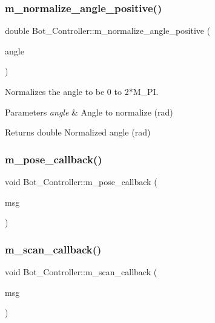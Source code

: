 \subsubsection{\texorpdfstring{m\+\_\+normalize\+\_\+angle\+\_\+positive()}{m\_normalize\_angle\_positive()}}
{\footnotesize\ttfamily double Bot\+\_\+\+Controller\+::m\+\_\+normalize\+\_\+angle\+\_\+positive (\begin{DoxyParamCaption}\item[{double}]{angle }\end{DoxyParamCaption})\hspace{0.3cm}{\ttfamily [protected]}}



Normalizes the angle to be 0 to 2$\ast$\+M\+\_\+\+PI. 


\begin{DoxyParams}{Parameters}
{\em angle} & Angle to normalize (rad) \\
\hline
\end{DoxyParams}
\begin{DoxyReturn}{Returns}
double Normalized angle (rad) 
\end{DoxyReturn}
\mbox{\label{class_bot___controller_acc77fd887b8ddc97431a33f3cf72e82c}} 
\subsubsection{\texorpdfstring{m\+\_\+pose\+\_\+callback()}{m\_pose\_callback()}}
{\footnotesize\ttfamily void Bot\+\_\+\+Controller\+::m\+\_\+pose\+\_\+callback (\begin{DoxyParamCaption}\item[{const nav\+\_\+msgs\+::\+Odometry\+::\+Const\+Ptr \&}]{msg }\end{DoxyParamCaption})\hspace{0.3cm}{\ttfamily [protected]}}

\mbox{\label{class_bot___controller_ae7a0c2b3a9a5adc3464dc581003c3ce1}} 
\subsubsection{\texorpdfstring{m\+\_\+scan\+\_\+callback()}{m\_scan\_callback()}}
{\footnotesize\ttfamily void Bot\+\_\+\+Controller\+::m\+\_\+scan\+\_\+callback (\begin{DoxyParamCaption}\item[{const sensor\+\_\+msgs\+::\+Laser\+Scan\+::\+Const\+Ptr \&}]{msg }\end{DoxyParamCaption})\hspace{0.3cm}{\ttfamily [protected]}}

